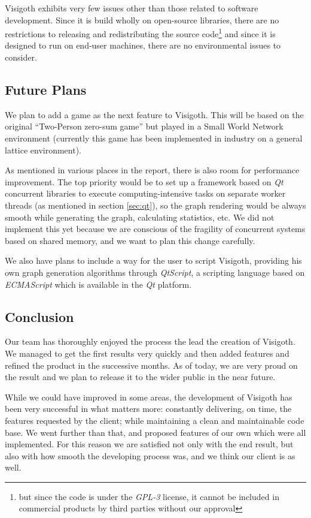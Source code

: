 \documentclass[a4paper,11pt,titlepage]{article}
\newcommand{\buzz}[1]{\emph{#1}}
\newcommand{\Qt}{\buzz{Qt} }
\begin{document}
Visigoth exhibits very few issues other than those related to software
development. Since it is build wholly on open-source libraries, there
are no restrictions to releasing and redistributing the source
code\footnote{but since the code is under the \buzz{GPL-3} license,
  it cannot be included in commercial products by third parties
  without our approval} and since it is designed to run on end-user
machines, there are no environmental issues to consider.

\subsection{Future Plans}

We plan to add a game as the next feature to Visigoth. This will be based on the
original ``Two-Person zero-sum game'' but played in a Small World Network
environment (currently this game has been implemented in industry on a general
lattice environment).

As mentioned in various places in the report, there is also room for performance
improvement. The top priority would be to set up a framework based on \Qt
concurrent libraries to execute computing-intensive tasks on separate worker
threads (as mentioned in section \ref{sec:qt}), so the graph rendering would be
always smooth while generating the graph, calculating statistics, etc. We did
not implement this yet because we are conscious of the fragility of concurrent
systems based on shared memory, and we want to plan this change carefully.

We also have plans to include a way for the user to script Visigoth, providing
his own graph generation algorithms through \buzz{QtScript}, a scripting
language based on \buzz{ECMAScript} which is available in the \Qt platform.

\subsection{Conclusion}

Our team has thoroughly enjoyed the process the lead the creation of
Visigoth. We managed to get the first results very quickly and then added
features and refined the product in the successive months. As of today, we are
very proud on the result and we plan to release it to the wider public in the
near future.

While we could have improved in some areas, the development of Visigoth has been
very successful in what matters more: constantly delivering, on time, the
features requested by the client; while maintaining a clean and maintainable
code base. We went further than that, and proposed features of our own which
were all implemented. For this reason we are satisfied not only with the end
result, but also with how smooth the developing process was, and we think our
client is as well.
\end{document}
